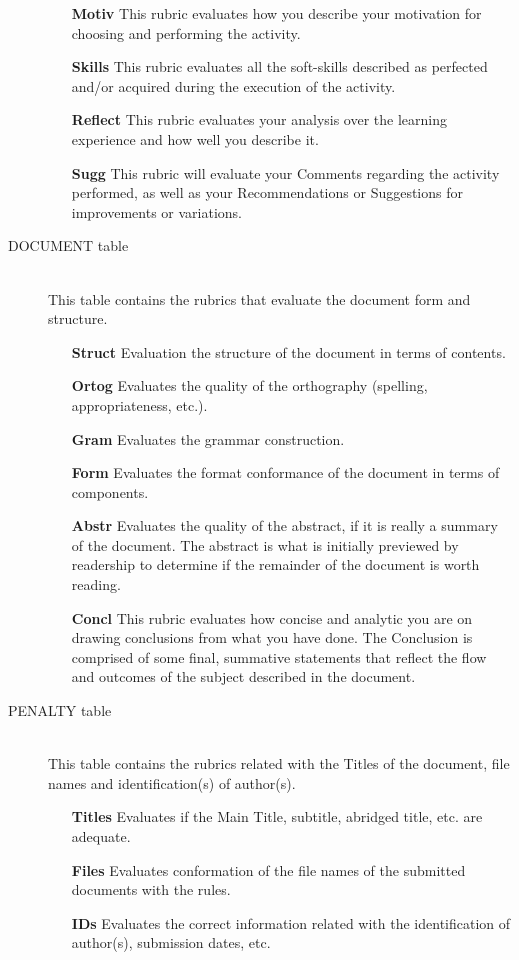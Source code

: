 \documentclass[a4paper,12pt,journal,twoside,compsoc]{PPIEEEtran}
\begin{document}
\begin{description}
\begin{itemize}
\item[\textbf{Motiv}] This rubric evaluates how you describe your motivation for choosing and performing the activity.
\item[\textbf{Skills}] This rubric evaluates all the soft-skills described as perfected and/or acquired during the execution of the activity.
\item[\textbf{Reflect}] This rubric evaluates your analysis over the learning experience and how well you describe it.
\item[\textbf{Sugg}] This rubric will evaluate your Comments regarding the activity performed, as well as your Recommendations or Suggestions for improvements or variations.
\end{itemize}
\item[DOCUMENT table] \hfill \\
This table contains the rubrics that evaluate the document form and structure.
\begin{itemize}
\item[\textbf{Struct}] Evaluation the structure of the document in terms of contents.
\item[\textbf{Ortog}] Evaluates the quality of the orthography (spelling, appropriateness, etc.).
\item[\textbf{Gram}] Evaluates the grammar construction.
\item[\textbf{Form}] Evaluates the format conformance of the document in terms of components.
\item[\textbf{Abstr}] Evaluates the quality of the abstract, if it is really a summary of the document. The abstract is what is initially previewed by readership to determine if the remainder of the document is worth reading. 
\item[\textbf{Concl}] This rubric evaluates how concise and analytic you are on drawing conclusions from what you have done. The Conclusion is comprised of some final, summative statements that reflect the flow and outcomes of the subject described in the document. 
\end{itemize}
\item[PENALTY table] \hfill \\
This table contains the rubrics related with the Titles of the document, file names and identification(s) of  author(s).
\begin{itemize}
\item[\textbf{Titles}] Evaluates if the Main Title, subtitle, abridged title, etc. are adequate.
\item[\textbf{Files}] Evaluates conformation of the file names of the submitted documents with the rules.
\item[\textbf{IDs}] Evaluates the correct information related with the identification of author(s), submission dates, etc.
\end{itemize}
\end{description}
\end{document}

